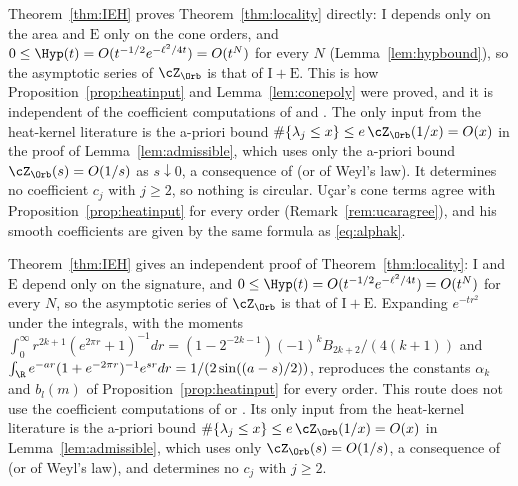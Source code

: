 \begin{remark}\label{rem:proofC}
Theorem~\ref{thm:IEH} proves Theorem~\ref{thm:locality} directly: $\mathrm I$ depends only on the
area and $\mathrm E$ only on the cone orders, and $0\le\Hyp(t)=O(t^{-1/2}e^{-\ell^2/4t})=O(t^N)$ for
every $N$ (Lemma~\ref{lem:hypbound}), so the asymptotic series of $\cZ_\Orb$ is that of
$\mathrm I+\mathrm E$. This is how Proposition~\ref{prop:heatinput} and Lemma~\ref{lem:conepoly} were
proved, and it is independent of the coefficient computations of \cite{dggw2008} and
\cite{ucar2017}. The only input from the heat-kernel literature is the a-priori bound
$\#\{\lambda_j\le x\}\le e\,\cZ_\Orb(1/x)=O(x)$ in the proof of Lemma~\ref{lem:admissible}, which uses
only the a-priori bound $\cZ_\Orb(s)=O(1/s)$ as $s\downarrow0$, a consequence of \cite[Thm~4.8]{dggw2008}
(or of Weyl's law). It determines no coefficient $c_j$ with $j\ge2$, so nothing is circular. U\c{c}ar's
cone terms \cite[(4.25), (4.33)--(4.34)]{ucar2017} agree with Proposition~\ref{prop:heatinput} for every
order (Remark~\ref{rem:ucaragree}), and his smooth coefficients \cite[(4.35)]{ucar2017} are given by
the same formula as \eqref{eq:alphak}.
\end{remark}


\begin{remark}\label{rem:proofC}
Theorem~\ref{thm:IEH} gives an independent proof of Theorem~\ref{thm:locality}: $\mathrm I$ and
$\mathrm E$ depend only on the signature, and $0\le\Hyp(t)=O(t^{-1/2}e^{-\ell^2/4t})=O(t^N)$ for every
$N$, so the asymptotic series of $\cZ_\Orb$ is that of $\mathrm I+\mathrm E$. Expanding
$e^{-tr^2}$ under the integrals, with the moments
$\int_0^\infty r^{2k+1}(e^{2\pi r}+1)^{-1}dr=(1-2^{-2k-1})(-1)^kB_{2k+2}/(4(k+1))$ and
$\int_\R e^{-ar}(1+e^{-2\pi r})^{-1}e^{sr}dr=1/(2\sin((a-s)/2))$, reproduces the constants $\alpha_k$
and $b_l(m)$ of Proposition~\ref{prop:heatinput} for every order. This route does not use the
coefficient computations of \cite{dggw2008} or \cite{ucar2017}. Its only input from the
heat-kernel literature is the a-priori bound $\#\{\lambda_j\le x\}\le e\,\cZ_\Orb(1/x)=O(x)$ in
Lemma~\ref{lem:admissible}, which uses only $\cZ_\Orb(s)=O(1/s)$, a consequence of
\cite[Thm~4.8]{dggw2008} (or of Weyl's law), and determines no $c_j$ with $j\ge2$.
\end{remark}

